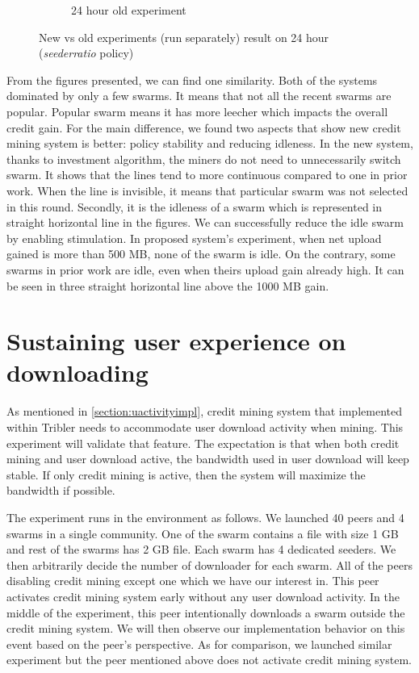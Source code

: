 \begin{figure}[h]
\begin{adjustwidth}{-1.5cm}{}
\begin{subfigure}[t]{0.6\textwidth}
			\caption{24 hour old experiment}
			\label{fig:oldetree24}
		\end{subfigure}
		\caption{New vs old experiments (run separately) result on 24 hour (\textit{seederratio} policy)}
	\end{adjustwidth}
\end{figure}
From the figures presented, we can find one similarity. Both of the systems dominated by only a few swarms. It means that not all the recent swarms are popular. Popular swarm means it has more leecher which impacts the overall credit gain. For the main difference, we found two aspects that show new credit mining system is better: policy stability and reducing idleness. In the new system, thanks to investment algorithm, the miners do not need to unnecessarily switch swarm. It shows that the lines tend to more continuous compared to one in prior work. When the line is invisible, it means that particular swarm was not selected in this round. Secondly, it is the idleness of a swarm which is represented in straight horizontal line in the figures. We can successfully reduce the idle swarm by enabling stimulation. In proposed system's experiment, when net upload gained is more than 500 MB, none of the swarm is idle. On the contrary, some swarms in prior work are idle, even when theirs upload gain already high. It can be seen in three straight horizontal line above the 1000 MB gain.

 
\section{Sustaining user experience on downloading}
\label{section:expprio}
As mentioned in \ref{section:uactivityimpl}, credit mining system that implemented within Tribler needs to accommodate user download activity when mining. This experiment will validate that feature. The expectation is that when both credit mining and user download active, the bandwidth used in user download will keep stable. If only credit mining is active, then the system will maximize the bandwidth if possible. 

The experiment runs in the environment as follows. We launched 40 peers and 4 swarms in a single community. One of the swarm contains a file with size 1 GB and rest of the swarms has 2 GB file. Each swarm has 4 dedicated seeders. We then arbitrarily decide the number of downloader for each swarm. All of the peers disabling credit mining except one which we have our interest in. This peer activates credit mining system early without any user download activity. In the middle of the experiment, this peer intentionally downloads a swarm outside the credit mining system. We will then observe our implementation behavior on this event based on the peer's perspective. As for comparison, we launched similar experiment but the peer mentioned above does not activate credit mining system. 

